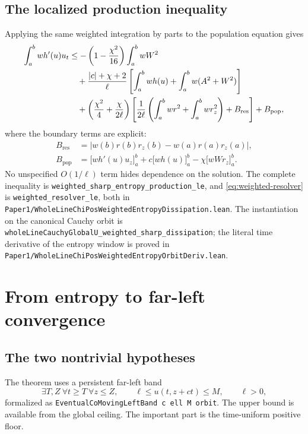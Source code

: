 \documentclass[11pt]{article}
\newcommand{\abs}[1]{\left\lvert #1\right\rvert}
\newcommand{\code}[1]{\nolinkurl{#1}}
\begin{document}
\subsection{The localized production inequality}

Applying the same weighted integration by parts to the population equation
gives
\begin{align}
 \int_a^b w h'(u)u_t
 &\le
 -\left(1-\frac{\chi^2}{16}\right)
     \int_a^b wW^2                                      \label{eq:weighted-main}\\
 &\quad+\frac{\abs c+\chi+2}{\ell}
   \left[
     \int_a^b wh(u)+
     \int_a^b w(A^2+W^2)
   \right] \notag\\
 &\quad+
 \left(\frac{\chi^2}{4}+\frac{\chi}{2\ell}\right)
 \left[
  \frac1{2\ell}\left(\int_a^b wr^2+\int_a^b wr_z^2\right)
  +B_{\mathrm{res}}
 \right]
 +B_{\mathrm{pop}}, \notag
\end{align}
where the boundary terms are explicit:
\begin{align*}
 B_{\mathrm{res}}
  &=\abs{w(b)r(b)r_z(b)-w(a)r(a)r_z(a)},\\
 B_{\mathrm{pop}}
  &=\bigl[w h'(u)u_z\bigr]_a^b
    +c\bigl[wh(u)\bigr]_a^b
    -\chi\bigl[wWr_z\bigr]_a^b.
\end{align*}
No unspecified \(O(1/\ell)\) term hides dependence on the solution.  The
complete inequality is
\code{weighted_sharp_entropy_production_le}, and
\eqref{eq:weighted-resolver} is \code{weighted_resolver_le}, both in
\code{Paper1/WholeLineChiPosWeightedEntropyDissipation.lean}.  The
instantiation on the canonical Cauchy orbit is
\code{wholeLineCauchyGlobalU_weighted_sharp_dissipation}; the literal time
derivative of the entropy window is proved in
\code{Paper1/WholeLineChiPosWeightedEntropyOrbitDeriv.lean}.

\section{From entropy to far-left convergence}

\subsection{The two nontrivial hypotheses}

The theorem uses a persistent far-left band
\begin{equation}
 \exists T,Z\ \forall t\ge T\ \forall z\le Z,\qquad
   \ell\le u(t,z+ct)\le M,\qquad \ell>0,                \label{eq:band}
\end{equation}
formalized as \code{EventualCoMovingLeftBand c ell M orbit}.
The upper bound is available from the global ceiling.  The important part is
the time-uniform positive floor.
\end{document}
